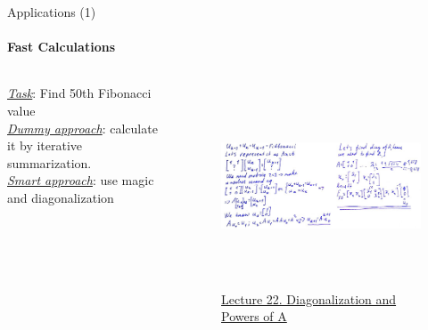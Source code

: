 \documentclass[aspectratio=169]{beamer}
\begin{document}

\begin{frame}[t]{Applications (1)}
    \framesubtitle{Fast Calculations}
            \begin{columns}[T,onlytextwidth]
                \begin{column}{0.3\textwidth}
                    \underline{\textit{Task}}: Find 50th Fibonacci value \\
\textit{\underline{Dummy approach}}: calculate it by iterative summarization. \\
\underline{\textit{Smart approach}}: use magic and diagonalization \\ 
                \end{column}
                \begin{column}{0.69\textwidth}
                    \begin{figure}[H]
                        \centering\includegraphics[height=6cm,width=1\textwidth,keepaspectratio]{fibo.jpg}
                        \caption*{ \Large \href{https://youtu.be/13r9QY6cmjc?t=2072}{Lecture 22. Diagonalization and Powers of A}}
                        \label{fig:fibo.jpg}
                    \end{figure}
                \end{column}
            \end{columns}
\end{frame}

\end{document}

